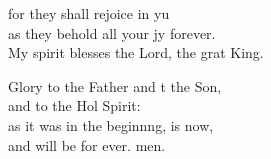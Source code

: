 \begin{psalmverse}
\begin{patverse}
for they shall rejoice in yu\Flex\\
as they behold all your jy forever.\Med\\
My spirit blesses the Lord, the grat King.

Glory to the Father and t the Son,\Med\\
and to the Hol Spirit:\\
as it was in the beginn\pointup{\i}ng, is now,\Med\\
and will be for ever. men.

  \end{patverse}
\end{psalmverse}
